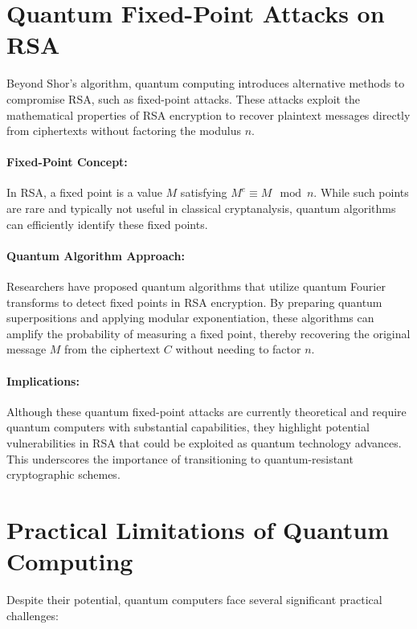 \documentclass{article}
\begin{document}
\section{Quantum Fixed-Point Attacks on RSA}

Beyond Shor's algorithm, quantum computing introduces alternative methods to compromise RSA, such as fixed-point attacks. These attacks exploit the mathematical properties of RSA encryption to recover plaintext messages directly from ciphertexts without factoring the modulus \( n \).

\paragraph{Fixed-Point Concept:} In RSA, a fixed point is a value \( M \) satisfying \( M^e \equiv M \mod n \). While such points are rare and typically not useful in classical cryptanalysis, quantum algorithms can efficiently identify these fixed points.

\paragraph{Quantum Algorithm Approach:} Researchers have proposed quantum algorithms that utilize quantum Fourier transforms to detect fixed points in RSA encryption. By preparing quantum superpositions and applying modular exponentiation, these algorithms can amplify the probability of measuring a fixed point, thereby recovering the original message \( M \) from the ciphertext \( C \) without needing to factor \( n \).

\paragraph{Implications:} Although these quantum fixed-point attacks are currently theoretical and require quantum computers with substantial capabilities, they highlight potential vulnerabilities in RSA that could be exploited as quantum technology advances. This underscores the importance of transitioning to quantum-resistant cryptographic schemes.


\section{Practical Limitations of Quantum Computing}
Despite their potential, quantum computers face several significant practical challenges:
\end{document}
